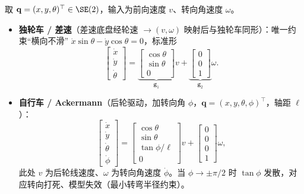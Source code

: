 \begin{example}\label{ex:nh-models}
取 $\mathbf{q}=(x,y,\theta)^\top\in\SE(2)$，输入为前向速度 $v$、转向角速度 $\omega$。
\begin{itemize}
  \item \textbf{独轮车 / 差速}（差速底盘经轮速 $\to(v,\omega)$ 映射后与独轮车同形）：唯一约束“横向不滑” $\dot x\sin\theta-\dot y\cos\theta=0$，标准形
  \begin{equation}
    \begin{bmatrix}\dot x\\\dot y\\\dot\theta\end{bmatrix}
    =\underbrace{\begin{bmatrix}\cos\theta\\\sin\theta\\0\end{bmatrix}}_{\mathbf{g}_1}v
    +\underbrace{\begin{bmatrix}0\\0\\1\end{bmatrix}}_{\mathbf{g}_2}\omega .
    \label{eq:nh-unicycle}
  \end{equation}
  \item \textbf{自行车 / Ackermann}（后轮驱动，加转向角 $\phi$，$\mathbf{q}=(x,y,\theta,\phi)^\top$，轴距 $\ell$）：
  \begin{equation}
    \begin{bmatrix}\dot x\\\dot y\\\dot\theta\\\dot\phi\end{bmatrix}
    =\begin{bmatrix}\cos\theta\\\sin\theta\\\tan\phi/\ell\\0\end{bmatrix}v
    +\begin{bmatrix}0\\0\\0\\1\end{bmatrix}\omega ,
    \label{eq:nh-bicycle}
  \end{equation}
  此处 $v$ 为后轮线速度、$\omega$ 为转向角速度 $\dot\phi$。当 $\phi\to\pm\pi/2$ 时 $\tan\phi$ 发散，对应转向打死、模型失效（最小转弯半径约束）。
\end{itemize}
\end{example}

